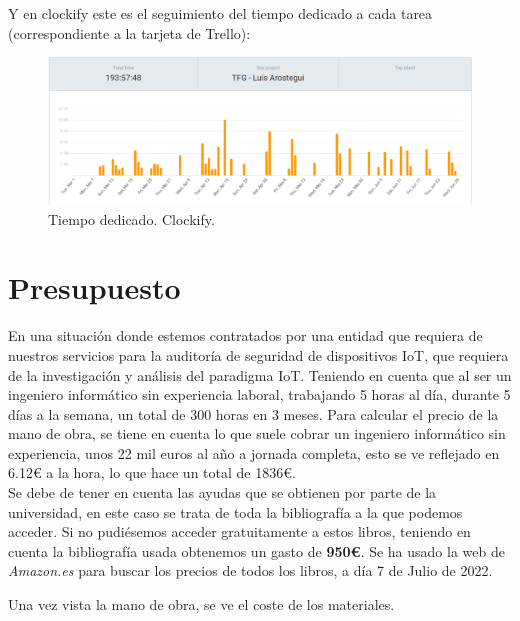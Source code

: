 \newpage

Y en clockify este es el seguimiento del tiempo dedicado a cada tarea (correspondiente a la tarjeta de Trello):


\begin{figure}[hb!]
    \centering
    \includegraphics[width=\linewidth]{imagenes/clockify.png}
    \caption{Tiempo dedicado. Clockify.}
    \label{fig:figure8-plan}
\end{figure}




\chapter{Presupuesto}

En una situación donde estemos contratados por una entidad que requiera de nuestros servicios para la auditoría de seguridad de dispositivos IoT, que requiera de la investigación y análisis del paradigma IoT. Teniendo en cuenta que al ser un ingeniero informático sin experiencia laboral, trabajando 5 horas al día, durante 5 días a la semana, un total de 300 horas en 3 meses. Para calcular el precio de la mano de obra, se tiene en cuenta lo que suele cobrar un ingeniero informático sin experiencia, unos 22 mil euros al año a jornada completa, esto se ve reflejado en 6.12€ a la hora, lo que hace un total de 1836€. \\

Se debe de tener en cuenta las ayudas que se obtienen por parte de la universidad, en este caso se trata de toda la bibliografía a la que podemos acceder. Si no pudiésemos acceder gratuitamente a estos libros, teniendo en cuenta la bibliografía usada obtenemos un gasto de \textbf{950€}. Se ha usado la web de \textit{Amazon.es} para buscar los precios de todos los libros, a día 7 de Julio de 2022.

Una vez vista la mano de obra, se ve el coste de los materiales.

